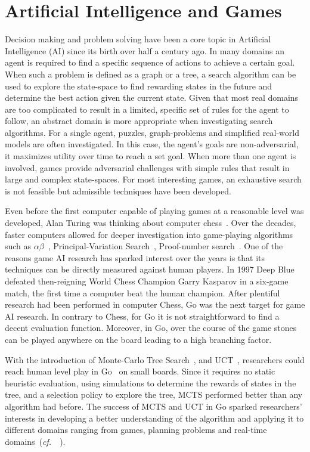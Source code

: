 \documentclass{kecsmstr}
\newcommand{\cf}{{\it cf.}~}
\begin{document}
\section{Artificial Intelligence and Games}
Decision making and problem solving have been a core topic in Artificial Intelligence (AI) since its birth over half a century ago. In many domains an agent is required to find a specific sequence of actions to achieve a certain goal. When such a problem is defined as a graph or a tree, a search algorithm can be used to explore the state-space to find rewarding states in the future and determine the best action given the current state.
Given that most real domains are too complicated to result in a limited, specific set of rules for the agent to follow, an abstract domain is more appropriate when investigating search algorithms. For a single agent, puzzles, graph-problems and simplified real-world models are often investigated. In this case, the agent's goals are non-adversarial, it maximizes utility over time to reach a set goal. When more than one agent is involved, games provide adversarial challenges with simple rules that result in large and complex state-spaces. For most interesting games, an exhaustive search is not feasible but admissible techniques have been developed.

Even before the first computer capable of playing games at a reasonable level was developed, Alan Turing was thinking about computer chess~. Over the decades, faster computers allowed for deeper investigation into game-playing algorithms such as $\alpha\beta$~, Principal-Variation Search~, Proof-number search~. One of the reasons game AI research has sparked interest over the years is that its techniques can be directly measured against human players. In 1997 {\sc Deep Blue}~ defeated then-reigning World Chess Champion Garry Kasparov in a six-game match, the first time a computer beat the human champion. After plentiful research had been performed in computer Chess, Go was the next target for game AI research. In contrary to Chess, for Go it is not straightforward to find a decent evaluation function. Moreover, in Go, over the course of the game stones can be played anywhere on the board leading to a high branching factor.

With the introduction of Monte-Carlo Tree Search~, and UCT~, researchers could reach human level play in Go~ on small boards. Since it requires no static heuristic evaluation, using simulations to determine the rewards of states in the tree, and a selection policy to explore the tree, MCTS performed better than any algorithm had before. The success of MCTS and UCT in Go sparked researchers' interests in developing a better understanding of the algorithm and applying it to different domains ranging from games, planning problems and real-time domains~(\cf~).
\end{document}
